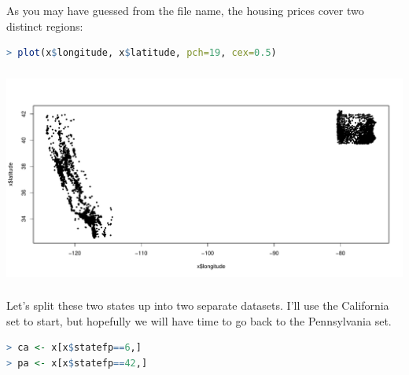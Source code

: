 \documentclass[xetex,mathserif,serif,aspectratio=169]{beamer}
\begin{document}
\begin{frame}[fragile] \frametitle{} \oldB \small

As you may have guessed from the file name, the housing
prices cover two distinct regions:
\begin{lstlisting}[language=R, basicstyle=\fontsize{8pt}{10pt}\selectfont\ttfamily]
> plot(x$longitude, x$latitude, pch=19, cex=0.5)
\end{lstlisting}

\end{frame}

\begin{frame}[fragile] \frametitle{} \oldB \small

\begin{center}
\includegraphics[width=\textwidth]{img/fig01.pdf}
\end{center}

\end{frame}

\begin{frame}[fragile] \frametitle{} \oldB \small

Let's split these two states up into two separate datasets.
I'll use the California set to start, but hopefully we will
have time to go back to the Pennsylvania set.
\begin{lstlisting}[language=R, basicstyle=\fontsize{8pt}{10pt}\selectfont\ttfamily]
> ca <- x[x$statefp==6,]
> pa <- x[x$statefp==42,]
\end{lstlisting}

\end{frame}
\end{document}
